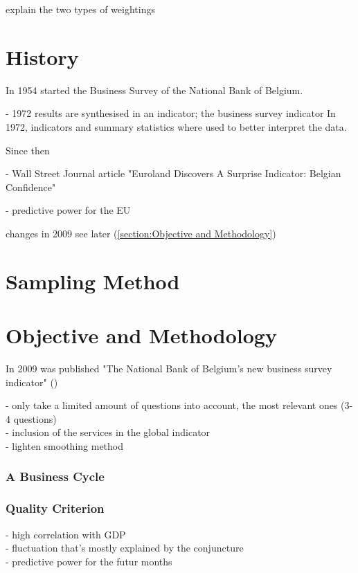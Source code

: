 \documentclass[12pt,a4paper,oneside]{book}
\begin{document}
explain the two types of weightings

\section{History}

In 1954 started the Business Survey of the National Bank of Belgium. 


- 1972 results are synthesised in an indicator; the business survey indicator
In 1972, indicators and summary statistics where used to better interpret the data. 

Since then  

- Wall Street Journal article "Euroland Discovers A Surprise Indicator: Belgian Confidence" \citep{rhoads_euroland_1999}

- predictive power for the EU \cite{vanhaelen_belgian_2000}

changes in 2009 see later (\autoref{section:Objective and Methodology})



\section{Sampling Method}




\section{Objective and Methodology}
\label{section:Objective and Methodology}
In 2009 was published "The National Bank of Belgium’s new business survey indicator" 
(\citeauthor{de_greef_national_2009})



- only take a limited amount of questions into account, the most relevant ones (3-4 questions) \\
- inclusion of the services in the global indicator \\
- lighten smoothing method

\subsubsection{A Business Cycle}



\subsubsection{Quality Criterion}
- high correlation with GDP \\
- fluctuation that's mostly explained by the conjuncture\\
- predictive power for the futur months 
\end{document}

